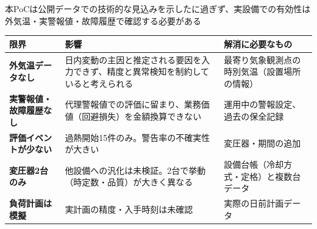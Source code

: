 \documentclass[aspectratio=169,10pt]{beamer}
\begin{document}
\begin{frame}{本PoCは公開データでの技術的な見込みを示したに過ぎず、実設備での有効性は外気温・実警報値・故障履歴で確認する必要がある}
  \footnotesize
  \renewcommand{\arraystretch}{1.35}
  \begin{tabularx}{\textwidth}{>{\bfseries}p{3.4cm} X X}
    \toprule
    限界 & 影響 & 解消に必要なもの \\
    \midrule
    外気温データなし & 日内変動の主因と推定される要因を入力できず、精度と異常検知を制約していると考えられる & 最寄り気象観測点の時別気温（設置場所の情報） \\
    実警報値・故障履歴なし & 代理警報値での評価に留まり、業務価値（回避損失）を金額換算できない & 運用中の警報設定、過去の保全記録 \\
    評価イベントが少ない & 過熱開始15件のみ。警告率の不確実性が大きい & 変圧器・期間の追加 \\
    変圧器2台のみ & 他設備への汎化は未検証。2台で挙動（時定数・品質）が大きく異なる & 設備台帳（冷却方式・定格）と複数台データ \\
    負荷計画は模擬 & 実計画の精度・入手時刻は未確認 & 実際の日前計画データ \\
    \bottomrule
  \end{tabularx}
\end{frame}
\end{document}
